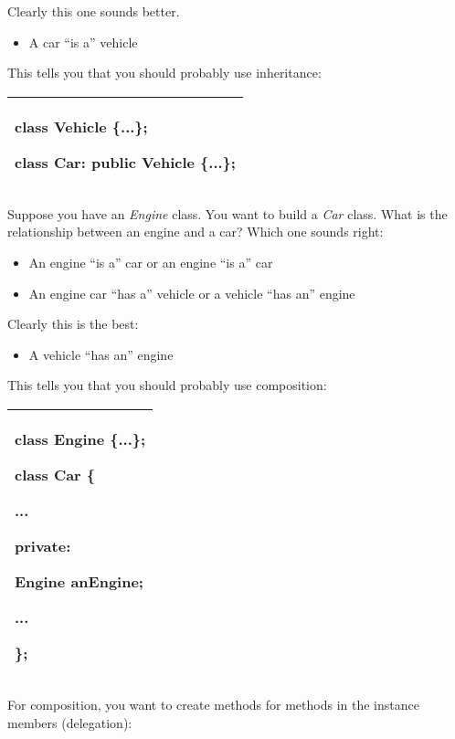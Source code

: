\documentclass[
]{article}
\providecommand{\tightlist}{%
  \setlength{\itemsep}{0pt}\setlength{\parskip}{0pt}}
\begin{document}
Clearly this one sounds better.

\begin{itemize}
\tightlist
\item
  A car ``is a'' vehicle
\end{itemize}

This tells you that you should probably use inheritance:

\begin{longtable}[]{@{}l@{}}
\toprule
\endhead
\begin{minipage}[t]{0.97\columnwidth}\raggedright
class Vehicle \{...\};

class Car: public Vehicle \{...\};\strut
\end{minipage}\tabularnewline
\bottomrule
\end{longtable}

Suppose you have an \emph{Engine} class. You want to build a \emph{Car}
class. What is the relationship between an engine and a car? Which one
sounds right:

\begin{itemize}
\tightlist
\item
  An engine ``is a'' car or an engine ``is a'' car
\item
  An engine car ``has a'' vehicle or a vehicle ``has an'' engine
\end{itemize}

Clearly this is the best:

\begin{itemize}
\tightlist
\item
  A vehicle ``has an'' engine
\end{itemize}

This tells you that you should probably use composition:

\begin{longtable}[]{@{}l@{}}
\toprule
\endhead
\begin{minipage}[t]{0.97\columnwidth}\raggedright
class Engine \{...\};

class Car \{

...

private:

Engine anEngine;

...

\};\strut
\end{minipage}\tabularnewline
\bottomrule
\end{longtable}

For composition, you want to create methods for methods in the instance
members (delegation):
\end{document}
